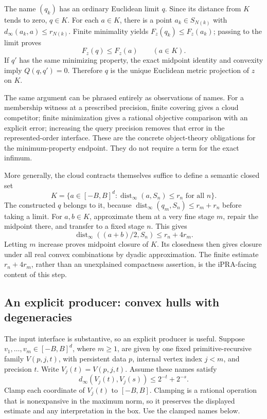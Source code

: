 The name \((q_k)\) has an ordinary Euclidean limit \(q\).  Since its
distance from \(K\) tends to zero, \(q\in K\).  For each \(a\in K\),
there is a point \(a_k\in S_{N(k)}\) with
\(d_\infty(a_k,a)\leq r_{N(k)}\).  Finite minimality yields
\(F_z(q_k)\leq F_z(a_k)\); passing to the limit proves
\[
             F_z(q)\leq F_z(a)\qquad(a\in K).
\]
If \(q'\) has the same minimizing property, the exact midpoint identity
and convexity imply \(Q(q,q')=0\).  Therefore \(q\) is the unique
Euclidean metric projection of \(z\) on \(K\).

The same argument can be phrased entirely as observations of names.
For a membership witness at a prescribed precision, finite covering gives
a cloud competitor; finite minimization gives a rational objective
comparison with an explicit error; increasing the query precision removes
that error in the represented-order interface.  These are the concrete
object-theory obligations for the minimum-property endpoint.  They do not
require a term for the exact infimum.

More generally, the cloud contracts themselves suffice to define a semantic
closed set
\[
 K=\{a\in[-B,B]^d:
            \operatorname{dist}_\infty(a,S_n)\leq r_n\text{ for all }n\}.
\]
The constructed \(q\) belongs to it, because
\(\operatorname{dist}_\infty(q_m,S_n)\leq r_m+r_n\) before taking a
limit.  For \(a,b\in K\), approximate them at a very fine stage \(m\),
repair the midpoint there, and transfer to a fixed stage \(n\).  This gives
\[
 \operatorname{dist}_\infty((a+b)/2,S_n)\leq r_n+4r_m.
\]
Letting \(m\) increase proves midpoint closure of \(K\).  Its closedness
then gives closure under all real convex combinations by dyadic
approximation.  The finite estimate \(r_n+4r_m\), rather than an
unexplained compactness assertion, is the iPRA-facing content of this step.

\subsection{An explicit producer: convex hulls with degeneracies}

The input interface is substantive, so an explicit producer is useful.
Suppose \(v_1,\ldots,v_m\in[-B,B]^d\), where \(m\geq1\), are given
by one fixed primitive-recursive family \(V(p,j,t)\), with persistent data \(p\), internal vertex index \(j<m\), and precision \(t\). Write \(V_j(t)=V(p,j,t)\). Assume these names satisfy
\[
 d_\infty(V_j(t),V_j(s))\leq2^{-t}+2^{-s}.
\]
Clamp each coordinate of \(V_j(t)\) to \([-B,B]\).  Clamping is a
rational operation that is nonexpansive in the maximum norm, so it
preserves the displayed estimate and any interpretation in the box.
Use the clamped names below.

